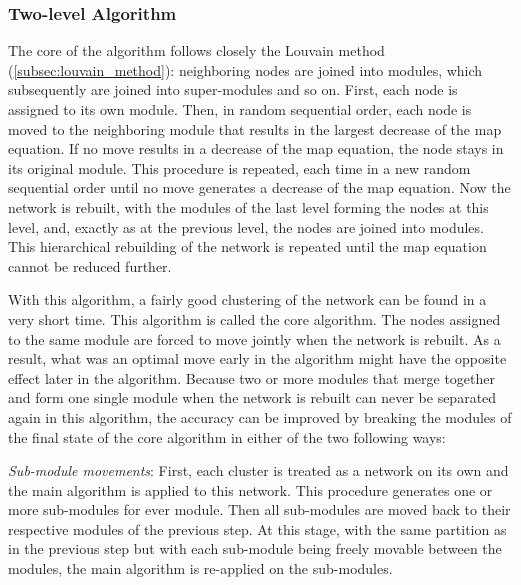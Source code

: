 \subsubsection*{Two-level Algorithm}\label{subsubsec:two_level_algorithm}
The core of the algorithm follows closely the Louvain method (\ref{subsec:louvain_method}): neighboring nodes are joined into modules, which subsequently are joined into super-modules and so on. First, each node is assigned to its own module. Then, in random sequential order, each node is moved to the neighboring module that results in the largest decrease of the map equation. If no move results in a decrease of the map equation, the node stays in its original module. This procedure is repeated, each time in a new random sequential order until no move generates a decrease of the map equation. Now the network is rebuilt, with the modules of the last level forming the nodes at this level, and, exactly as at the previous level, the nodes are joined into modules. This hierarchical rebuilding of the network is repeated until the map equation cannot be reduced further.

With this algorithm, a fairly good clustering of the network can be found in a very short time. This algorithm is called the core algorithm. The nodes assigned to the same module are forced to move jointly when the network is rebuilt. As a result, what was an optimal move early in the algorithm might have the opposite effect later in the algorithm. Because two or more modules that merge together and form one single module when the network is rebuilt can never be separated again in this algorithm, the accuracy can be improved by breaking the modules of the final state of the core algorithm in either of the two following ways:

\textit{Sub-module movements}: First, each cluster is treated as a network on its own and the main algorithm is applied to this network. This procedure generates one or more sub-modules for ever module. Then all sub-modules are moved back to their respective modules of the previous step. At this stage, with the same partition as in the previous step but with each sub-module being freely movable between the modules, the main algorithm is re-applied on the sub-modules.

